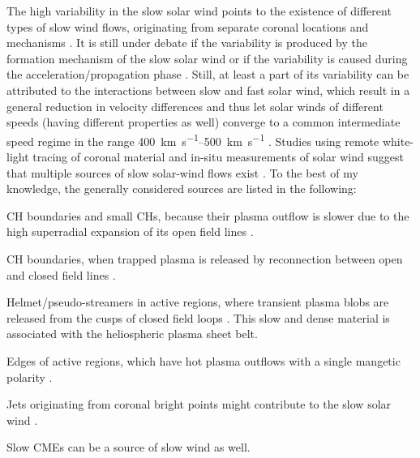 The high variability in the slow solar wind points to the existence of different types of slow wind flows, originating from separate coronal locations and mechanisms \citep{Schwenn1983}. It is still under debate if the variability is produced by the formation mechanism of the slow solar wind or if the variability is caused during the acceleration/propagation phase \citep{Sanchez-Diaz2016}. Still, at least a part of its variability can be attributed to the interactions between slow and fast solar wind, which result in a general reduction in velocity differences and thus let solar winds of different speeds (having different properties as well) converge to a common intermediate speed regime in the range \SIrange{400}{500}{\km\per\s} \citep{McGregor2011a,Sanchez-Diaz2016}. Studies using remote white-light tracing of coronal material and in-situ measurements of solar wind suggest that multiple sources of slow solar-wind flows exist \citep{Wang2000,Kilpua2016}. To the best of my knowledge, the generally considered sources are listed in the following:
\begin{itemize*}
	\item CH boundaries and small CHs, because their plasma outflow is slower due to the high superradial expansion of its open field lines \citep{Wang1990}.
	\item CH boundaries, when trapped plasma is released by reconnection between open and closed field lines \citep{Madjarska2004}.
	\item Helmet/pseudo-streamers in active regions, where transient plasma blobs are released from the cusps of closed field loops \citep{Wang1998,Wang2000}. This slow and dense material is associated with the heliospheric plasma sheet belt.
	\item Edges of active regions, which have hot plasma outflows with a single mangetic polarity \citep{Kojima1999}.
	\item Jets originating from coronal bright points might contribute to the slow solar wind \citep{Subramanian2010}.
	\item Slow CMEs can be a source of slow wind as well.
\end{itemize*}

